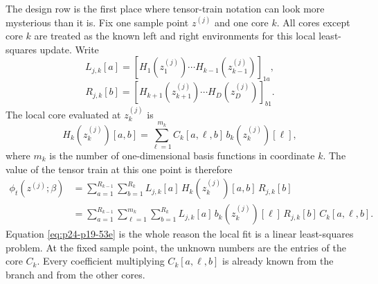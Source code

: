 \documentclass[11pt]{article}
\numberwithin{equation}{section}
\begin{document}
The design row is the first place where tensor-train notation can look more
mysterious than it is.  Fix one sample point \(z^{(j)}\) and one core \(k\).
All cores except core \(k\) are treated as the known left and right
environments for this local least-squares update.  Write
\begin{equation}
    L_{j,k}[a]
    =
    \left[
    H_{1}(z_1^{(j)})\cdots H_{k-1}(z_{k-1}^{(j)})
    \right]_{1a},
    \label{eq:p24-p19-53b}
\end{equation}
\begin{equation}
    R_{j,k}[b]
    =
    \left[
    H_{k+1}(z_{k+1}^{(j)})\cdots H_D(z_D^{(j)})
    \right]_{b1}.
    \label{eq:p24-p19-53c}
\end{equation}
The local core evaluated at \(z_k^{(j)}\) is
\begin{equation}
    H_k(z_k^{(j)})[a,b]
    =
    \sum_{\ell=1}^{m_k}
    C_k[a,\ell,b]\,b_k(z_k^{(j)})[\ell],
    \label{eq:p24-p19-53d}
\end{equation}
where \(m_k\) is the number of one-dimensional basis functions in coordinate
\(k\).  The value of the tensor train at this one point is therefore
\begin{equation}
\begin{aligned}
    \phi_t(z^{(j)};\beta)
    &=
    \sum_{a=1}^{R_{k-1}}
    \sum_{b=1}^{R_k}
    L_{j,k}[a]\,H_k(z_k^{(j)})[a,b]\,R_{j,k}[b]\\
    &=
    \sum_{a=1}^{R_{k-1}}
    \sum_{\ell=1}^{m_k}
    \sum_{b=1}^{R_k}
    L_{j,k}[a]\,
    b_k(z_k^{(j)})[\ell]\,
    R_{j,k}[b]\,
    C_k[a,\ell,b].
\end{aligned}
    \label{eq:p24-p19-53e}
\end{equation}
Equation \eqref{eq:p24-p19-53e} is the whole reason the local fit is a linear least-squares
problem.  At the fixed sample point, the unknown numbers are the entries of
the core \(C_k\).  Every coefficient multiplying \(C_k[a,\ell,b]\) is already
known from the branch and from the other cores.
\end{document}
